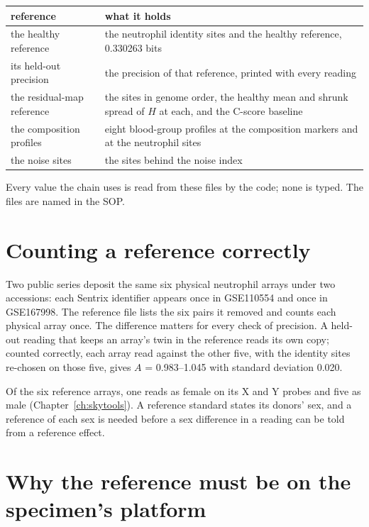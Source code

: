 \begin{center}\small
\begin{tabular}{@{}p{}p{}@{}}\toprule
reference & what it holds \\\midrule
the healthy reference & the neutrophil identity sites and the healthy reference, 0.330263 bits \\
its held-out precision & the precision of that reference, printed with every reading \\
the residual-map reference & the sites in genome order, the healthy mean and shrunk spread of $H$ at each, and the C-score baseline \\
the composition profiles & eight blood-group profiles at the composition markers and at the neutrophil sites \\
the noise sites & the sites behind the noise index \\\bottomrule
\end{tabular}
\end{center}
\calibrated{} Every value the chain uses is read from these files by the code; none is typed. The files are named in the SOP.

\section{Counting a reference correctly}

Two public series deposit the same six physical neutrophil arrays under two accessions: each Sentrix identifier appears once in GSE110554 and once in
GSE167998. The reference file lists the six pairs it removed and counts each physical array once. \measured{} The difference matters for every check of precision. A held-out reading that keeps an array's twin in the
reference reads its own copy; counted correctly, each array read against the other five, with the identity sites re-chosen on those five, gives $A$ =
0.983--1.045 with standard deviation 0.020. \measured

Of the six reference arrays, one reads as female on its X and Y probes and five as male (Chapter~\ref{ch:skytools}). \measured{} A reference standard
states its donors' sex, and a reference of each sex is needed before a sex difference in a reading can be told from a reference effect. \openprob

\section{Why the reference must be on the specimen's platform}

